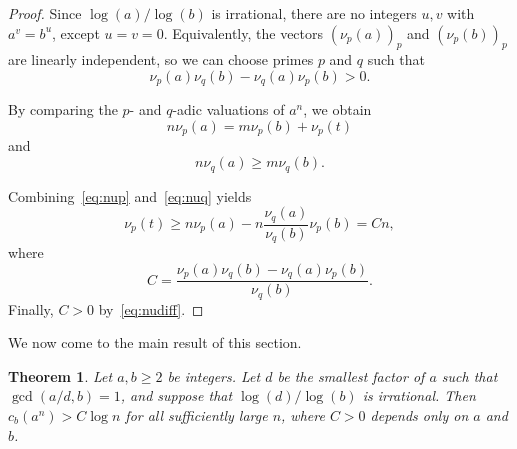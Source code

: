\documentclass[12pt]{amsart}
\newtheorem{theorem}{Theorem}
\theoremstyle{remark}
\begin{document}
\begin{proof}
    Since $\log(a) / \log(b)$ is irrational,
    there are no integers $u, v$ with $a^v = b^u$, except $u = v = 0$.
    Equivalently, the vectors $(\nu_p(a))_p$ and
    $(\nu_p(b))_p$ are linearly independent,
    so we can choose primes $p$ and $q$ such that
    \begin{equation} \label{eq:nudiff}
        \nu_p(a) \nu_q(b) - \nu_q(a) \nu_p(b) > 0.
    \end{equation}

    By comparing the $p$- and $q$-adic valuations of $a^n$,
    we obtain
    \begin{equation} \label{eq:nup}
        n \nu_p(a) = m \nu_p(b) + \nu_p(t)
    \end{equation}
    and
    \begin{equation} \label{eq:nuq}
        n \nu_q(a) \ge m \nu_q(b).
    \end{equation}

    Combining~\eqref{eq:nup} and~\eqref{eq:nuq} yields
    \begin{equation} \label{eq:nupq}
        \nu_p(t) \ge n \nu_p(a) - n \frac{\nu_q(a)}{\nu_q(b)} \nu_p(b) = C n,
    \end{equation}
    where
    \[
        C = \frac{\nu_p(a) \nu_q(b) - \nu_q(a) \nu_p(b)}{\nu_q(b)}.
    \]
    Finally, $C > 0$ by~\eqref{eq:nudiff}.
\end{proof}

We now come to the main result of this section.

\begin{theorem} \label{thm:general-digit-sum}
    Let $a, b \ge 2$ be integers. Let $d$ be the smallest factor of $a$
    such that $\gcd(a/d, b) = 1$, and suppose that $\log(d) / \log(b)$ is irrational.
    Then $c_b(a^n) > C \log n$ for all sufficiently large $n$,
    where $C > 0$ depends only on $a$ and $b$.
\end{theorem}
\end{document}
